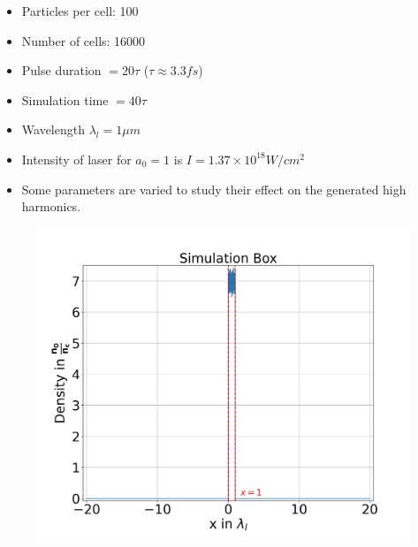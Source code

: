 \documentclass{beamer}
\begin{document}
\begin{frame}
    \begin{minipage}[t]{0.48\linewidth}
        \begin{itemize}
            \item Particles per cell: 100
            \item Number of cells: 16000
            \item Pulse duration $= 20 \tau$ ($\tau\approx 3.3 fs$)
            \item Simulation time $= 40 \tau$
            \item Wavelength $\lambda_l = 1 \mu m$
            \item Intensity of laser for $a_0 = 1$ is $I = 1.37 \times 10^{18} W/cm^2$
            \item Some parameters are varied to study their effect on the generated high harmonics.
        \end{itemize}
    \end{minipage}
    \begin{minipage}[t]{0.48\linewidth}
        \begin{figure}
            \centering
            \includegraphics[width=1.0\textwidth, height=0.62\textheight]{images/plasma.jpg}
            \label{fig:plasma}
        \end{figure}
    \end{minipage}


\end{frame}
\end{document}
